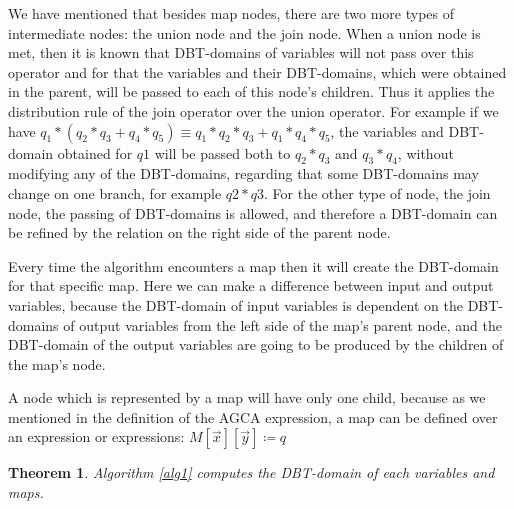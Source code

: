 \documentclass[12pt]{article}
\newtheorem{theorem}{Theorem}[section]
\begin{document}
We have mentioned that besides map nodes, there are two more types of intermediate nodes: the union node and the join node. When a union node is met, then it is known that DBT-domains of variables will not pass over this operator and for that the variables and their DBT-domains, which were obtained in the parent, will be passed to each of this node's children. Thus it applies the distribution rule of the join operator over the union operator. For example if we have $ q_{1} * (q_{2} * q_{3} + q_{4} * q_{5}) \equiv q_{1} * q_{2} * q_{3} + q_{1} * q_{4} * q_{5}$, the variables and DBT-domain obtained for $q1$ will be passed both to $q_{2}*q_{3}$ and $q_{3}*q_{4}$, without modifying any of the DBT-domains, regarding that some DBT-domains may change on one branch, for example $q2*q3$. For the other type of node, the join node, the passing of DBT-domains is allowed, and therefore a DBT-domain can be refined by the relation on the right side of the parent node.
	
Every time the algorithm encounters a map then it will create the DBT-domain for that specific map. Here we can make a difference between input and output variables, because the DBT-domain of input variables is dependent on the DBT-domains of output variables from the left side of the map's parent node, and the DBT-domain of the output variables are going to be produced by the children of the map's node. %

A node which is represented by a map will have only one child, because as we mentioned in the definition of the AGCA expression, a map can be defined over an expression or expressions: $M[\vec{x}][\vec{y}]\coloneqq q$
\begin{theorem}
Algorithm \ref{alg1} computes the DBT-domain of each variables and maps.
\end{theorem}
\end{document}
